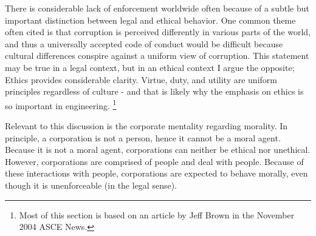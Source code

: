 There is considerable lack of enforcement worldwide often because of a subtle but important distinction between legal and ethical behavior.  One common theme often cited is that corruption is perceived differently in various parts of the world, and thus a universally accepted code of conduct would be difficult because cultural differences conspire against a uniform view of corruption.  This statement may be true in a legal context, but in an ethical context I argue the opposite; Ethics provides considerable clarity.  Virtue, duty, and utility are uniform principles regardless of culture - and that is likely why the emphasis on ethics is so important in engineering. \footnote{Most of this section is based on an article by Jeff Brown in the November 2004 ASCE News.}

Relevant to this discussion is the corporate mentality regarding morality.  In principle, a corporation is not a person, hence it cannot be a moral agent.  Because it is not a moral agent, corporations can neither be ethical nor unethical.  However, corporations are comprised of people and deal with people.
Because of these interactions with people, corporations are expected to behave morally, even though it is unenforceable (in the legal sense). 